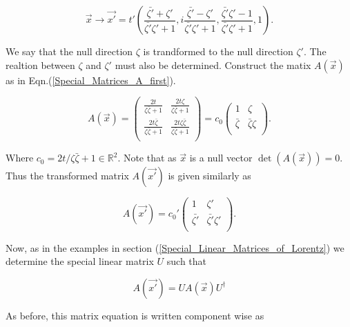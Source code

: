 \begin{equation*}
\vec{x} \rightarrow \vec{x'} = t'\left( \frac{\bar{\zeta'} + \zeta'}{\bar{\zeta'}\zeta' + 1}  ,i\frac{\bar{\zeta'} - \zeta'}{\bar{\zeta'}\zeta' + 1}, \frac{\bar{\zeta'}\zeta' - 1}{\bar{\zeta'}\zeta' + 1},1  \right).
\end{equation*}

\noindent We say that the null direction $\zeta$ is trandformed to the null direction $\zeta'$. The realtion between $\zeta$ and $\zeta'$ must also be determined. Construct the matix $A(\vec{x})$ as in Eqn.(\ref{Special_Matrices_A_first}). 

\begin{equation*}
A(\vec{x}) = 
\left(
\begin{array}{cc}
\frac{2t}{\zeta\bar{\zeta}+1} & \frac{2t\zeta}{\zeta\bar{\zeta}+1} \\
\frac{2t\bar{\zeta}}{\zeta\bar{\zeta}+1} & \frac{2t\zeta\bar{\zeta}}{\zeta\bar{\zeta}+1} \\
\end{array}
\right)
=
c_0\left(
\begin{array}{cc}
1           & \zeta \\ 
\bar{\zeta} & \bar{\zeta}\zeta \\ 
\end{array}
\right).
\end{equation*}

\noindent Where $c_0 = 2t/\zeta\bar{\zeta}+1 \in \mathbb{R}^2$. Note that as $\vec{x}$ is a null vector $\det{(A(\vec{x}))} = 0$. Thus the transformed matrix $A(\vec{x'})$ is given similarly as

\begin{equation*}
A(\vec{x'}) = 
{c_0}'\left(
\begin{array}{cc}
1           & \zeta' \\ 
\bar{\zeta'} & \bar{\zeta'}\zeta' \\ 
\end{array}
\right).
\end{equation*}

\noindent Now, as in the examples in section (\ref{Special_Linear_Matrices_of_Lorentz}) we determine the special linear matrix $U$ such that

\begin{equation}\label{Ext_Complex_UAU}
A(\vec{x'}) = U A(\vec{x}) U^{\dagger}
\end{equation}

\noindent As before, this matrix equation is written component wise as

